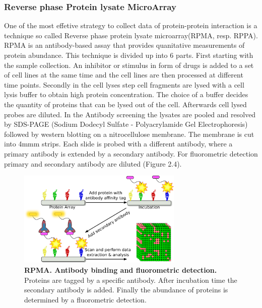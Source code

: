\subsubsection*{Reverse phase Protein lysate MicroArray}
One of the most effetive strategy to collect data of protein-protein interaction is a technique so called Reverse phase protein lysate microarray(\gls{RPMA}, resp. RPPA). RPMA is an antibody-based assay that provides quanitative measurements of protein abundance.
\citep{the HPN DREAM consotium}
This technique is divided up into 6 parts. First starting with the sample collection. An inhibitor or stimulus in form of drugs is added to a set of cell lines at the same time and the cell lines are then processed at different time points. Secondly in the cell lyses step cell fragments are lysed with a cell lysis buffer to obtain high protein concentration. The choice of a buffer decides the quantity of proteins that can be lysed out of the cell. Afterwards cell lysed probes are diluted. In the Antibody screening the lysates are pooled and resolved by \gls{SDS-PAGE} 
(Sodium Dodecyl Sulfate - Polyacrylamide Gel Electrophoresis) followed by western blotting on a nitrocellulose membrane. The membrane is cut into 4mmm strips. Each slide is probed with a different antibody, where a primary antibody is extended by a secondary antibody. For fluorometric detection primary and secondary antibody are diluted (Figure 2.4).

\begin{figure}[H]
	\captionsetup{width=0.7\linewidth}
	\centering
	\includegraphics[width=0.7\textwidth]{./Bilder/RPMA.pdf}
	\caption[RPMA: Antibody binding and fluorometric detection]{\textbf{RPMA. Antibody binding and fluorometric detection.} Proteins are tagged by a specific antibody. After incubation time the secondary antibody is added. Finally the abundance of proteins is determined by a fluorometric detection.}
	\label{fig:Fig.4}
\end{figure}

